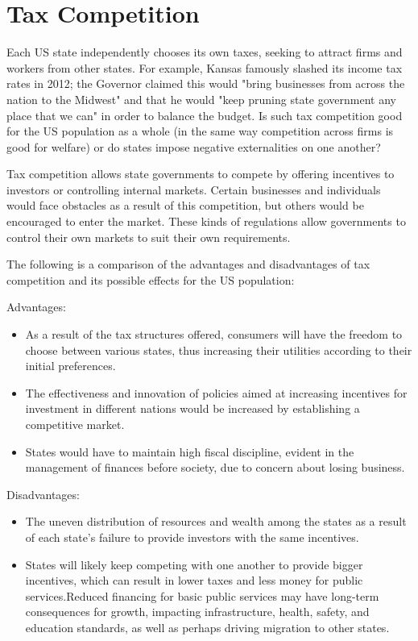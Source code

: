 \section{Tax Competition}

\begin{tcolorbox}
    Each US state independently chooses its own taxes, seeking to attract firms and workers from other states. For example, Kansas famously slashed its income tax rates in 2012; the Governor claimed this would "bring businesses from across the nation to the Midwest" and that he would "keep pruning state government any place that we can" in order to balance the budget. Is such tax competition good for the US population as a whole (in the same way competition across firms is good for welfare) or do states impose negative externalities on one another?

\end{tcolorbox}

Tax competition allows state governments to compete by offering incentives to investors or controlling internal markets. Certain businesses and individuals would face obstacles as a result of this competition, but others would be encouraged to enter the market. These kinds of regulations allow governments to control their own markets to suit their own requirements.

The following is a comparison of the advantages and disadvantages of tax competition and its possible effects for the US population:

Advantages:

\begin{itemize}
\item As a result of the tax structures offered, consumers will have the freedom to choose between various states, thus increasing their utilities according to their initial preferences.
\item The effectiveness and innovation of policies aimed at increasing incentives for investment in different nations would be increased by establishing a competitive market.
\item States would have to maintain high fiscal discipline, evident in the management of finances before society, due to concern about losing business.
\end{itemize}

Disadvantages:

\begin{itemize}
\item The uneven distribution of resources and wealth among the states as a result of each state's failure to provide investors with the same incentives.
\item States will likely keep competing with one another to provide bigger incentives, which can result in lower taxes and less money for public services.Reduced financing for basic public services may have long-term consequences for growth, impacting infrastructure, health, safety, and education standards, as well as perhaps driving migration to other states.
\end{itemize}

